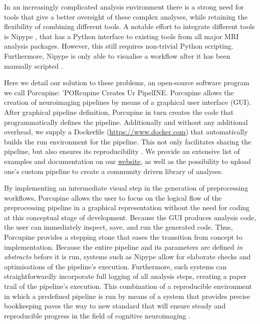 In an increasingly complicated analysis environment there is a strong need for tools that give a better oversight of these complex analyses, while retaining the flexibility of combining different tools. A notable effort to integrate different tools is Nipype \cite{Gorgolewski2011}, that has a Python interface to existing tools from all major MRI analysis packages. However, this still requires non-trivial Python scripting. Furthermore, Nipype is only able to visualise a workflow after it has been manually scripted \cite{Ellson2002}.

Here we detail our solution to these problems, an open-source software program we call Porcupine: 'PORcupine Creates Ur PipelINE. Porcupine allows the creation of neuroimaging pipelines by means of a graphical user interface (GUI). After graphical pipeline definition, Porcupine in turn creates the code that programmatically defines the pipeline. Additionally and without any additional overhead, we supply a Dockerfile (\url{https://www.docker.com}) that automatically builds the run environment for the pipeline. This not only facilitates sharing the pipeline, but also ensures its reproducibility \cite{Boettiger2015}. We provide an extensive list of examples and documentation on our \href{https://timvanmourik.github.io/Porcupine/examples}{website}, as well as the possibility to upload one's custom pipeline to create a community driven library of analyses.

By implementing an intermediate visual step in the generation of preprocessing workflows, Porcupine allows the user to focus on the logical flow of the preprocessing pipeline in a graphical representation without the need for coding at this conceptual stage of development. Because the GUI produces  analysis code, the user can immediately inspect, save, and run the generated code. Thus, Porcupine provides a stepping stone that eases the transition from concept to implementation. Because the entire pipeline and its parameters are defined \emph{in abstracto} before it is run, systems such as Nipype allow for elaborate checks and optimisations of the pipeline's execution. Furthermore, such systems can straightforwardly incorporate full logging of all analysis steps, creating a paper trail of the pipeline's execution. This combination of a reproducible environment in which a predefined pipeline is run by means of a system that provides precise bookkeeping paves the way to new standard that will ensure steady and reproducible progress in the field of cognitive neuroimaging \cite{Gorgolewski2016a}. 

